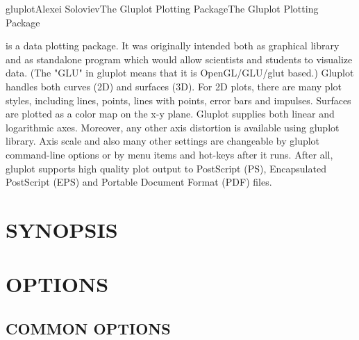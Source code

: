 
\begin{Name}{1}{gluplot}{Alexei Soloviev}{The Gluplot Plotting Package}{The Gluplot Plotting Package}

 is a data plotting package. It was originally intended 
both as graphical library and as standalone program which would 
allow scientists and students to visualize data. 
(The "GLU" in gluplot means that it is OpenGL/GLU/glut based.) 
Gluplot handles both curves (2D) and surfaces (3D). For 2D plots, 
there are many plot styles, including lines, points, lines with 
points, error bars and impulses. Surfaces are plotted as a color 
map on the x-y plane. 
Gluplot supplies both linear and logarithmic axes. Moreover, 
any other axis distortion is available using gluplot library. 
Axis scale and also many other settings are changeable by gluplot 
command-line options or by menu items and hot-keys after it runs. 
After all, gluplot supports high quality plot output to PostScript (PS), 
Encapsulated PostScript (EPS) and Portable Document Format (PDF) files. 
\end{Name}


\section{SYNOPSIS}




\section{OPTIONS}

\subsection{COMMON OPTIONS}

